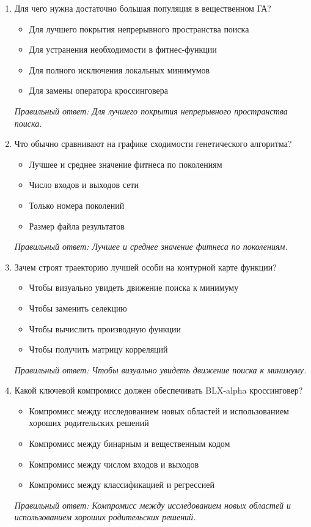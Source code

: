 \begin{enumerate}[label=\textbf{\arabic*.}, leftmargin=0pt, itemsep=1.2em]
\item Для чего нужна достаточно большая популяция в вещественном ГА?
\begin{itemize}[label=$\square$, leftmargin=1.5cm, itemsep=0.2em, topsep=0.3em]
\item Для лучшего покрытия непрерывного пространства поиска
\item Для устранения необходимости в фитнес-функции
\item Для полного исключения локальных минимумов
\item Для замены оператора кроссинговера
\end{itemize}
{\small\textit{Правильный ответ: Для лучшего покрытия непрерывного пространства поиска.}}

\item Что обычно сравнивают на графике сходимости генетического алгоритма?
\begin{itemize}[label=$\square$, leftmargin=1.5cm, itemsep=0.2em, topsep=0.3em]
\item Лучшее и среднее значение фитнеса по поколениям
\item Число входов и выходов сети
\item Только номера поколений
\item Размер файла результатов
\end{itemize}
{\small\textit{Правильный ответ: Лучшее и среднее значение фитнеса по поколениям.}}

\item Зачем строят траекторию лучшей особи на контурной карте функции?
\begin{itemize}[label=$\square$, leftmargin=1.5cm, itemsep=0.2em, topsep=0.3em]
\item Чтобы визуально увидеть движение поиска к минимуму
\item Чтобы заменить селекцию
\item Чтобы вычислить производную функции
\item Чтобы получить матрицу корреляций
\end{itemize}
{\small\textit{Правильный ответ: Чтобы визуально увидеть движение поиска к минимуму.}}

\item Какой ключевой компромисс должен обеспечивать BLX-alpha кроссинговер?
\begin{itemize}[label=$\square$, leftmargin=1.5cm, itemsep=0.2em, topsep=0.3em]
\item Компромисс между исследованием новых областей и использованием хороших родительских решений
\item Компромисс между бинарным и вещественным кодом
\item Компромисс между числом входов и выходов
\item Компромисс между классификацией и регрессией
\end{itemize}
{\small\textit{Правильный ответ: Компромисс между исследованием новых областей и использованием хороших родительских решений.}}


\end{enumerate}
